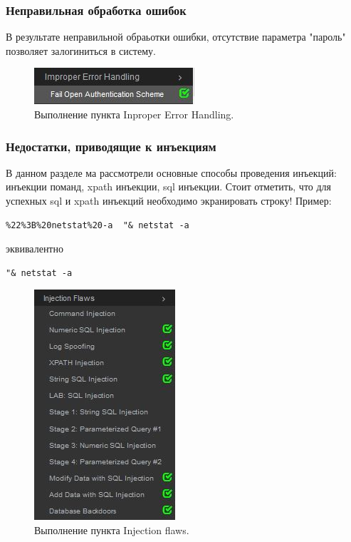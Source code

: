 \documentclass[10pt,a4paper]{article}
\begin{document}
\subsubsection{Неправильная обработка ошибок}

В результате неправильной обраьотки ошибки, отсутствие параметра "пароль" позволяет залогиниться в систему.

\begin{figure}[h!]
\centering
\includegraphics[scale=0.7]{8.jpg}
\caption{Выполнение пункта Inproper Error Handling.}
\end{figure}

\subsubsection{Недостатки, приводящие к инъекциям}

В данном разделе ма рассмотрели основные способы проведения инъекций: инъекции поманд, xpath инъекции, sql инъекции. Стоит отметить, что для успехных sql и xpath инъекций необходимо экранировать строку! Пример:
\begin{verbatim}
%22%3B%20netstat%20-a  "& netstat -a
\end{verbatim}

эквивалентно

\begin{verbatim}
"& netstat -a
\end{verbatim}

\begin{figure}[h!]
\centering
\includegraphics[scale=0.7]{9.jpg}
\caption{Выполнение пункта Injection flaws.}
\end{figure}
\end{document}

